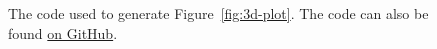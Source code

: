 \documentclass[a4paper]{article}
\begin{document}
\begin{figure}[h]
	\centering
	\inputminted{python}{./code/plot_surface.py}
	\caption{The code used to generate Figure~\ref{fig:3d-plot}. The code can also be found \href{https://github.com/DoctorDalek1963/uni/blob/1ee2e9f33bdd8e5d2054b4487684af46f686b5bd/first-year/MA144-Methods-of-Mathematical-Modelling-2/Ass 2/code/plot_surface.py}{on GitHub}.}
\end{figure}

\end{document}
